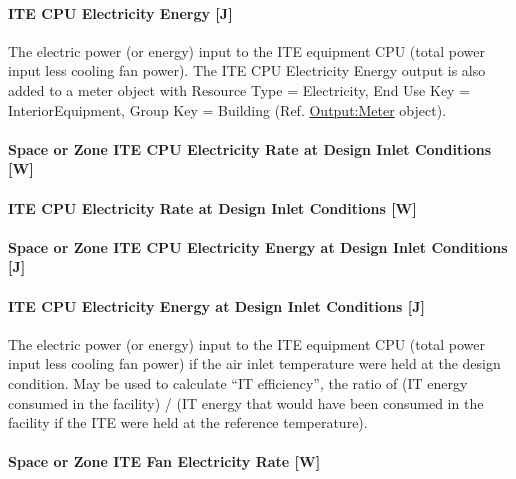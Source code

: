 \paragraph{ITE CPU Electricity Energy {[}J{]}}\label{ite-cpu-electric-energy-j}

The electric power (or energy) input to the ITE equipment CPU (total power input less cooling fan power). The ITE CPU Electricity Energy output is also added to a meter object with Resource Type = Electricity, End Use Key = InteriorEquipment, Group Key = Building (Ref. \hyperref[outputmeter-and-outputmetermeterfileonly]{Output:Meter} object).

\paragraph{Space or Zone ITE CPU Electricity Rate at Design Inlet Conditions {[}W{]}}\label{zone-ite-cpu-electric-power-at-design-inlet-conditions-w}

\paragraph{ITE CPU Electricity Rate at Design Inlet Conditions {[}W{]}}\label{ite-cpu-electric-power-at-design-inlet-conditions-w}

\paragraph{Space or Zone ITE CPU Electricity Energy at Design Inlet Conditions {[}J{]}}\label{zone-ite-cpu-electric-energy-at-design-inlet-conditions-j}

\paragraph{ITE CPU Electricity Energy at Design Inlet Conditions {[}J{]}}\label{ite-cpu-electric-energy-at-design-inlet-conditions-j}

The electric power (or energy) input to the ITE equipment CPU (total power input less cooling fan power) if the air inlet temperature were held at the design condition. May be used to calculate ``IT efficiency'', the ratio of (IT energy consumed in the facility) / (IT energy that would have been consumed in the facility if the ITE were held at the reference temperature).

\paragraph{Space or Zone ITE Fan Electricity Rate {[}W{]}}\label{zone-ite-fan-electric-power-w}

